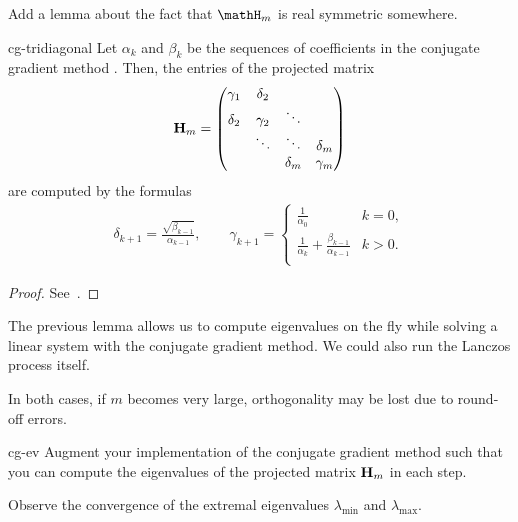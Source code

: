 \begin{todo}
  Add a lemma about the fact that $\mathH_m$ is real symmetric somewhere.
\end{todo}

\begin{Lemma}{cg-tridiagonal}
  Let $\alpha_k$ and $\beta_k$ be the sequences of coefficients in the conjugate gradient method
  . Then, the entries of the projected matrix
  \begin{gather}
    \mathbf H_m =
    \begin{pmatrix}
            \gamma_1 & \delta_2\\
      \delta_2 & \gamma_2 & \ddots\\
      &\ddots&\ddots&\delta_m\\
      &&\delta_{m}&\gamma_m
    \end{pmatrix}
  \end{gather}
  are computed by the formulas
  \begin{gather}
    \delta_{k+1} = \frac{\sqrt{\beta_{k-1}}}{\alpha_{k-1}},
    \qquad
    \gamma_{k+1} =
    \begin{cases}
      \tfrac1{\alpha_0}&k=0,\\
      \tfrac1{\alpha_k} + \tfrac{\beta_{k-1}}{\alpha_{k-1}} &k>0.\\
    \end{cases}
  \end{gather}
\end{Lemma}

\begin{proof}
  See~\cite[Section 6.7.3]{Saad00}.
\end{proof}

\begin{remark}
  The previous lemma allows us to compute eigenvalues on the fly while
  solving a linear system with the conjugate gradient method. We could
  also run the Lanczos process  itself.

  In both cases, if $m$ becomes very large, orthogonality may be lost
  due to round-off errors.
\end{remark}

\begin{Problem}{cg-ev}
  Augment your implementation of the conjugate gradient method such
  that you can compute the eigenvalues of the projected matrix
  $\mathbf H_m$ in each step.

  Observe the convergence of the extremal eigenvalues $\lambda_{\text{min}}$
  and $\lambda_{\text{max}}$.
\end{Problem}

